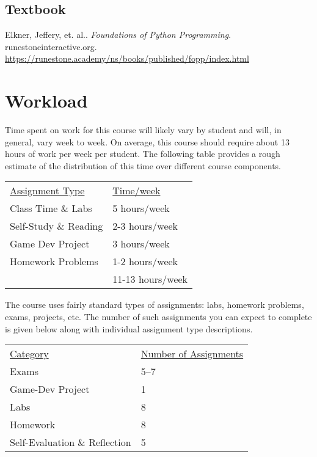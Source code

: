 \documentclass[10pt]{article}
\begin{document}
\subsection{Textbook}

\noindent
Elkner, Jeffery, et. al.. \textit{Foundations of Python Programming}.  runestoneinteractive.org. \url{https://runestone.academy/ns/books/published/fopp/index.html} %


\section{Workload}


Time spent on work for this course will likely vary by student and will, in general, vary week to week. On average, this course should require about 13 hours of work per week per student.  The following table provides a rough estimate of the distribution of this time over different course components.
\begin{center}
\begin{tabular}{ll}
\underline{Assignment Type} & \underline{Time/week} \\
Class Time \& Labs       & 5 hours/week \\
Self-Study \& Reading & 2-3 hours/week \\
Game Dev Project           & 3 hours/week \\
Homework Problems   & 1-2 hours/week \\
\bottomrule
 & 11-13 hours/week
\end{tabular}
\end{center}


The course uses fairly standard types of assignments: labs, homework problems, exams, projects, etc. The number of such assignments you can expect to complete is given below along with individual assignment type descriptions.
\begin{center}
  \begin{tabular}{ll}
    \underline{Category} & \underline{Number of Assignments} \\
    Exams & 5--7 \\
    Game-Dev Project & 1 \\
    Labs & 8 \\
    Homework & 8 \\
    Self-Evaluation \&  Reflection & 5 \\
  \end{tabular}
\end{center}
\end{document}
